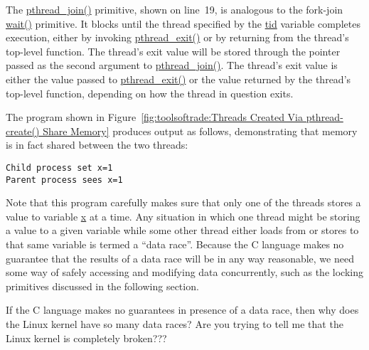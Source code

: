 The \url{pthread_join()} primitive, shown on line~19,  is analogous to
the fork-join \url{wait()} primitive.
It blocks until the thread specified by the \url{tid} variable completes
execution, either by invoking \url{pthread_exit()} or by returning from
the thread's top-level function.
The thread's exit value will be stored through the pointer passed as the
second argument to \url{pthread_join()}.
The thread's exit value is either the value passed to \url{pthread_exit()}
or the value returned by the thread's top-level function, depending on
how the thread in question exits.

The program shown in
Figure~\ref{fig:toolsoftrade:Threads Created Via pthread-create() Share Memory}
produces output as follows, demonstrating that memory is in fact
shared between the two threads:

\vspace{5pt}
\begin{minipage}[t]{\columnwidth}
\begin{verbatim}
Child process set x=1
Parent process sees x=1
\end{verbatim}
\end{minipage}
\vspace{5pt}

Note that this program carefully makes sure that only one of the threads
stores a value to variable \url{x} at a time.
Any situation in which one thread might be storing a value to a given
variable while some other thread either loads from or stores to that
same variable is termed a ``data race''.
Because the C language makes no guarantee that the results of a data race
will be in any way reasonable, we need some way of safely accessing
and modifying data concurrently, such as the locking primitives discussed
in the following section.

\QuickQuiz{}
	If the C language makes no guarantees in presence of a data
	race, then why does the Linux kernel have so many data races?
	Are you trying to tell me that the Linux kernel is completely
	broken???
 \QuickQuizEnd


